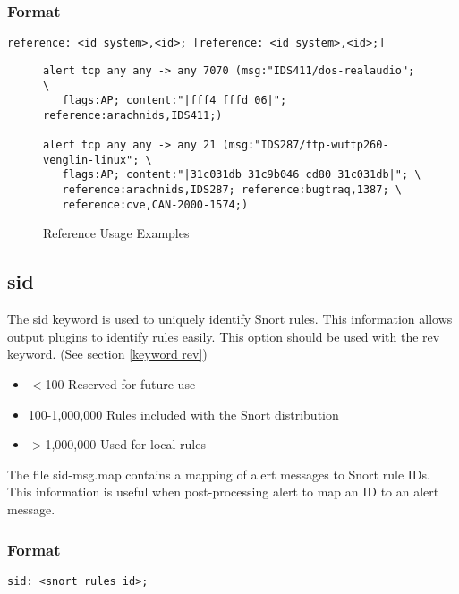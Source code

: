 \documentclass[english]{report}
\begin{document}
\subsubsection{Format}

\begin{verbatim}
reference: <id system>,<id>; [reference: <id system>,<id>;]
\end{verbatim}

\begin{figure}[!hbpt]
\begin{verbatim}
alert tcp any any -> any 7070 (msg:"IDS411/dos-realaudio"; \
   flags:AP; content:"|fff4 fffd 06|"; reference:arachnids,IDS411;)

alert tcp any any -> any 21 (msg:"IDS287/ftp-wuftp260-venglin-linux"; \
   flags:AP; content:"|31c031db 31c9b046 cd80 31c031db|"; \
   reference:arachnids,IDS287; reference:bugtraq,1387; \
   reference:cve,CAN-2000-1574;)
\end{verbatim}

\caption{Reference Usage Examples\label{example reference rule}}
\end{figure}

\subsection{sid\label{keyword sid}}

The sid keyword is used to uniquely identify Snort rules. This information
allows output plugins to identify rules easily.  This option should be used
with the rev keyword.  (See section \ref{keyword rev})

\begin{itemize}
\item $<$100 Reserved for future use
\item 100-1,000,000 Rules included with the Snort distribution
\item $>$1,000,000 Used for local rules
\end{itemize}

The file sid-msg.map contains a mapping of alert messages to Snort rule IDs.
This information is useful when post-processing alert to map an ID to an alert
message.  

\subsubsection{Format}

\begin{verbatim}
sid: <snort rules id>;
\end{verbatim}
\end{document}
